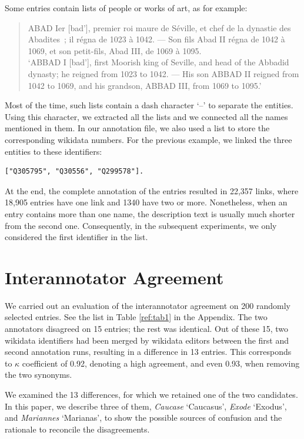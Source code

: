 \documentclass[10pt, a4paper]{article}
\begin{document}
Some entries contain lists of people or works of art, as for example:
\begin{quote}
ABAD Ier [bad'], premier roi maure de Séville, et chef de la dynastie des Abadites~; il régna de 1023 à 1042. — Son fils Abad II régna de 1042 à 1069, et son petit-fils, Abad III, de 1069 à 1095.\\
`ABBAD I [bad'], first Moorish king of Seville, and head of the Abbadid dynasty; he reigned from 1023 to 1042. — His son ABBAD II reigned from 1042 to 1069, and his grandson, ABBAD III, from 1069 to 1095.'
\end{quote}
Most of the time, such lists contain a dash character `--' to separate the entities. Using this character, we extracted all the lists and we connected all the names mentioned in them. In our annotation file, we also used a list to store the corresponding wikidata numbers. For the previous example, we linked the three entities to these identifiers: 
\begin{verbatim}
["Q305795", "Q30556", "Q299578"]. 
\end{verbatim}
At the end, the complete annotation of the entries resulted in 22,357 links, where 18,905 entries have one link and 1340 have two or more. Nonetheless, when an entry contains more than one name, the description text is usually much shorter from the second one. Consequently, in the subsequent experiments, we only considered the first identifier in the list.

\section{Interannotator Agreement}
We carried out an evaluation of the interannotator agreement on 200 randomly selected entries. See the list in Table \ref{ref:tab1} in the Appendix. The two annotators disagreed on 15 entries; the rest was identical. Out of these 15, two wikidata identifiers had been merged by wikidata editors between the first and second annotation runs, resulting in a difference in 13 entries. This corresponds to $\kappa$ coefficient \cite{Cohen1960} of 0.92, denoting a high agreement, and even 0.93, when removing the two synonyms.

We examined the 13 differences, for which we retained one of the two candidates. In this paper, we describe three of them, \textit{Caucase} `Caucasus', \textit{Exode} `Exodus', and \textit{Mariannes} `Marianas', to show the possible sources of confusion and the rationale to reconcile the disagreements.
\end{document}
